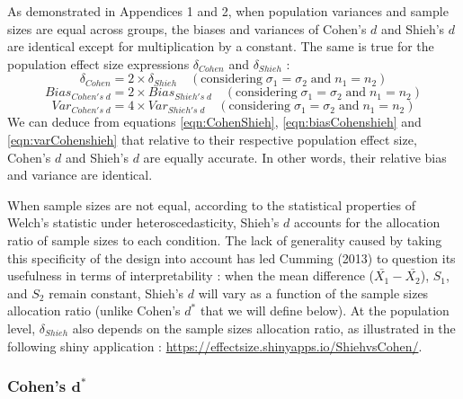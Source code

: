 \documentclass[
  english,
  man,floatsintext]{apa6}
\begin{document}
As demonstrated in Appendices 1 and 2, when population variances and sample sizes are equal across groups, the biases and variances of Cohen's \(d\) and Shieh's \(d\) are identical except for multiplication by a constant. The same is true for the population effect size expressions \(\delta_{Cohen}\) and \(\delta_{Shieh}\) :\\
\begin{equation} 
\delta_{Cohen} = 2 \times \delta_{Shieh} \quad (\mbox{considering} \; \sigma_1 = \sigma_2 \; \mbox{and} \; n_1 = n_2)
\label{eqn:CohenShieh}
\end{equation}
\begin{equation} 
Bias_{Cohen's \; d} = 2 \times Bias_{Shieh's \; d} \quad (\mbox{considering} \; \sigma_1 = \sigma_2 \; \mbox{and} \; n_1 = n_2)
\label{eqn:biasCohenshieh}
\end{equation}
\begin{equation} 
Var_{Cohen's \; d} = 4 \times Var_{Shieh's \; d} \quad (\mbox{considering}\; \sigma_1 = \sigma_2 \; \mbox{and} \; n_1 = n_2)
\label{eqn:varCohenshieh}
\end{equation}
We can deduce from equations \ref{eqn:CohenShieh}, \ref{eqn:biasCohenshieh} and \ref{eqn:varCohenshieh} that relative to their respective population effect size, Cohen's \(d\) and Shieh's \(d\) are equally accurate. In other words, their relative bias and variance are identical.

When sample sizes are not equal, according to the statistical properties of Welch's statistic under heteroscedasticity, Shieh's \(d\) accounts for the allocation ratio of sample sizes to each condition. The lack of generality caused by taking this specificity of the design into account has led Cumming (2013) to question its usefulness in terms of interpretability : when the mean difference (\(\bar{X_1}-\bar{X_2}\)), \(S_1\), and \(S_2\) remain constant, Shieh's \(d\) will vary as a function of the sample sizes allocation ratio (unlike Cohen's \(d^*\) that we will define below). At the population level, \(\delta_{Shieh}\) also depends on the sample sizes allocation ratio, as illustrated in the following shiny application : \url{https://effectsize.shinyapps.io/ShiehvsCohen/}.

\hypertarget{cohens-bmd}{%
\subsubsection{\texorpdfstring{Cohen's \(\bm{d^*}\)}{Cohen's \textbackslash bm\{d\^{}*\}}}\label{cohens-bmd}}
\end{document}

